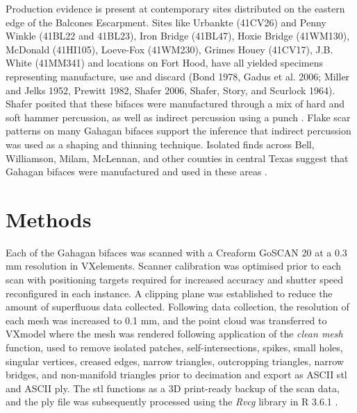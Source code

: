 \documentclass[review]{elsarticle}
\begin{document}
Production evidence is present at contemporary sites distributed on the eastern edge of the Balcones Escarpment. Sites like Urbankte (41CV26) and Penny Winkle (41BL22 and 41BL23), Iron Bridge (41BL47), Hoxie Bridge (41WM130), McDonald (41HI105), Loeve-Fox (41WM230), Grimes Houey (41CV17), J.B. White (41MM341) and locations on Fort Hood, have all yielded specimens representing manufacture, use and discard (Bond 1978, Gadus et al. 2006; Miller and Jelks 1952, Prewitt 1982, Shafer 2006, Shafer, Story, and Scurlock 1964). Shafer posited that these bifaces were manufactured through a mix of hard and soft hammer percussion, as well as indirect percussion using a punch \citep{RN4924,RN3684}. Flake scar patterns on many Gahagan bifaces support the inference that indirect percussion was used as a shaping and thinning technique. Isolated finds across Bell, Williamson, Milam, McLennan, and other counties in central Texas suggest that Gahagan bifaces were manufactured and used in these areas \citep{RN4924}.

\section*{Methods}

Each of the Gahagan bifaces was scanned with a Creaform GoSCAN 20 at a 0.3 mm resolution in VXelements. Scanner calibration was optimised prior to each scan with positioning targets required for increased accuracy and shutter speed reconfigured in each instance. A clipping plane was established to reduce the amount of superfluous data collected. Following data collection, the resolution of each mesh was increased to 0.1 mm, and the point cloud was transferred to VXmodel where the mesh was rendered following application of the \textit{clean mesh} function, used to remove isolated patches, self-intersections, spikes, small holes, singular vertices, creased edges, narrow triangles, outcropping triangles, narrow bridges, and non-manifold triangles prior to decimation and export as ASCII stl and ASCII ply. The stl functions as a 3D print-ready backup of the scan data, and the ply file was subsequently processed using the \textit{Rvcg} library in R 3.6.1 \citep{RN20849,R,RN20850}.
\end{document}
